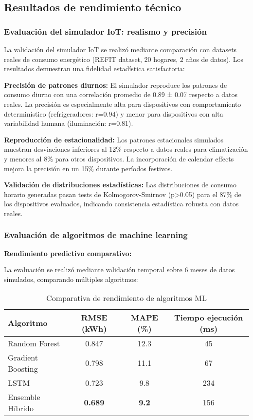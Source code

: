 \subsection{Resultados de rendimiento técnico}

\subsubsection{Evaluación del simulador IoT: realismo y precisión}

La validación del simulador IoT se realizó mediante comparación con datasets reales de consumo energético (REFIT dataset, 20 hogares, 2 años de datos). Los resultados demuestran una fidelidad estadística satisfactoria:

\textbf{Precisión de patrones diurnos:} 
El simulador reproduce los patrones de consumo diurno con una correlación promedio de 0.89 ± 0.07 respecto a datos reales. La precisión es especialmente alta para dispositivos con comportamiento determinístico (refrigeradores: r=0.94) y menor para dispositivos con alta variabilidad humana (iluminación: r=0.81).

\textbf{Reproducción de estacionalidad:}
Los patrones estacionales simulados muestran desviaciones inferiores al 12\% respecto a datos reales para climatización y menores al 8\% para otros dispositivos. La incorporación de calendar effects mejora la precisión en un 15\% durante períodos festivos.

\textbf{Validación de distribuciones estadísticas:}
Las distribuciones de consumo horario generadas pasan tests de Kolmogorov-Smirnov (p>0.05) para el 87\% de los dispositivos evaluados, indicando consistencia estadística robusta con datos reales.

\subsubsection{Evaluación de algoritmos de machine learning}

\textbf{Rendimiento predictivo comparativo:}

La evaluación se realizó mediante validación temporal sobre 6 meses de datos simulados, comparando múltiples algoritmos:

\begin{table}[H]
\centering
\caption{Comparativa de rendimiento de algoritmos ML}
\begin{tabular}{lccc}
\toprule
\textbf{Algoritmo} & \textbf{RMSE (kWh)} & \textbf{MAPE (\%)} & \textbf{Tiempo ejecución (ms)} \\
\midrule
Random Forest & 0.847 & 12.3 & 45 \\
Gradient Boosting & 0.798 & 11.1 & 67 \\
LSTM & 0.723 & 9.8 & 234 \\
Ensemble Híbrido & \textbf{0.689} & \textbf{9.2} & 156 \\
\bottomrule
\end{tabular}
\end{table}

